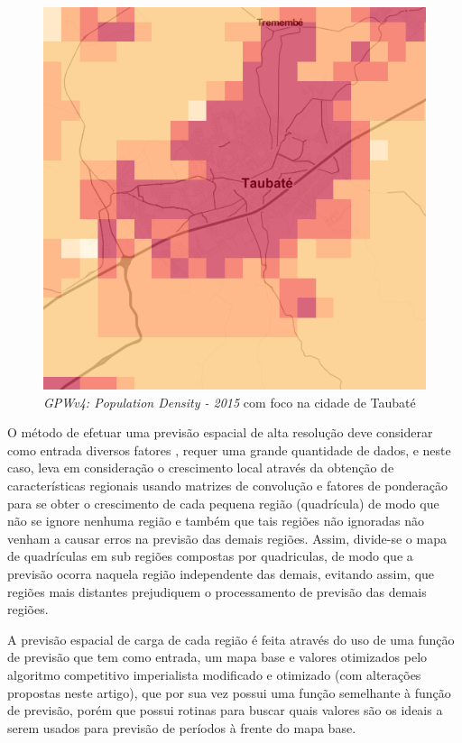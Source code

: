 \begin{figure}[h]
	\centering	
	\includegraphics[scale=1]{Figuras/sedacGPWv4.png}
	\caption{\emph{GPWv4: Population Density - 2015} com foco na cidade de Taubaté }
	\label{fig:sedacGPWv4}
\end{figure}

O método de efetuar uma previsão espacial de alta resolução deve considerar como entrada diversos fatores \cite{willis2002spatial}, requer uma grande quantidade de dados, e neste caso, leva em consideração o crescimento local através da obtenção de características regionais usando matrizes de convolução e fatores de ponderação para se obter o crescimento de cada pequena região (quadrícula) de modo que não se ignore nenhuma região e também que tais regiões não ignoradas não venham a causar erros na previsão das demais regiões. Assim, divide-se o mapa de quadrículas em sub regiões compostas por quadriculas, de modo que a previsão ocorra naquela região independente das demais, evitando assim, que regiões mais distantes prejudiquem o processamento de previsão das demais regiões.

A previsão espacial de carga de cada região é feita através do uso de uma função de previsão que tem como entrada, um mapa base \cite{willis2002spatial} e valores otimizados pelo algoritmo competitivo imperialista \cite{atashpaz2007imperialist} modificado \cite{roche2011imperialist} e otimizado (com alterações propostas neste artigo), que por sua vez possui uma função semelhante à função de previsão, porém que possui rotinas para buscar quais valores são os ideais a serem usados para previsão de períodos à frente do mapa base.

